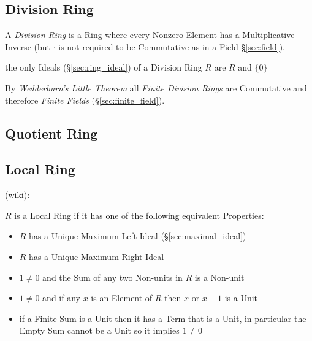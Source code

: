 \subsection{Division Ring}\label{sec:division_ring}

A \emph{Division Ring} is a Ring where every Nonzero Element has a
Multiplicative Inverse (but $\cdot$ is not required to be Commutative
as in a Field \S\ref{sec:field}).

the only Ideals (\S\ref{sec:ring_ideal}) of a Division Ring $R$ are $R$ and
$\{0\}$

By \emph{Wedderburn's Little Theorem} all \emph{Finite Division Rings}
are Commutative and therefore \emph{Finite Fields}
(\S\ref{sec:finite_field}).



\subsection{Quotient Ring}\label{sec:quotient_ring}

\subsection{Local Ring}\label{sec:local_ring}

(wiki):

$R$ is a Local Ring if it has one of the following equivalent Properties:
\begin{itemize}
  \item $R$ has a Unique Maximum Left Ideal (\S\ref{sec:maximal_ideal})
  \item $R$ has a Unique Maximum Right Ideal
  \item $1 \neq 0$ and the Sum of any two Non-units in $R$ is a Non-unit
  \item $1 \neq 0$ and if any $x$ is an Element of $R$ then $x$ or $x - 1$ is a
    Unit
  \item if a Finite Sum is a Unit then it has a Term that is a Unit, in
    particular the Empty Sum cannot be a Unit so it implies $1 \neq 0$
\end{itemize}


